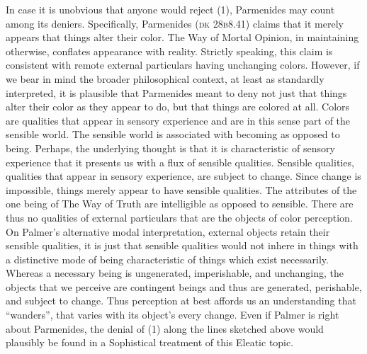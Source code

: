 In case it is unobvious that anyone would reject (1), Parmenides may count among its deniers. Specifically, Parmenides (\textsc{dk} 28\textsc{b}8.41) claims that it merely appears that things alter their color. The Way of Mortal Opinion, in maintaining otherwise, conflates appearance with reality. Strictly speaking, this claim is consistent with remote external particulars having unchanging colors. However, if we bear in mind the broader philosophical context, at least as standardly interpreted, it is plausible that Parmenides meant to deny not just that things alter their color as they appear to do, but that things are colored at all. Colors are qualities that appear in sensory experience and are in this sense part of the sensible world. The sensible world is associated with becoming as opposed to being. Perhaps, the underlying thought is that it is characteristic of sensory experience that it presents us with a flux of sensible qualities. Sensible qualities, qualities that appear in sensory experience, are subject to change. Since change is impossible, things merely appear to have sensible qualities. The attributes of the one being of The Way of Truth are intelligible as opposed to sensible. There are thus no qualities of external particulars that are the objects of color perception. On Palmer's \citeyearpar{Palmer:2009qf} alternative modal interpretation, external objects retain their sensible qualities, it is just that sensible qualities would not inhere in things with a distinctive mode of being characteristic of things which exist necessarily. Whereas a necessary being is ungenerated, imperishable, and unchanging, the objects that we perceive are contingent beings and thus are generated, perishable, and subject to change. Thus perception at best affords us an understanding that ``wanders'', that varies with its object's every change. Even if Palmer is right about Parmenides, the denial of (1) along the lines sketched above would plausibly be found in a Sophistical treatment of this Eleatic topic.

